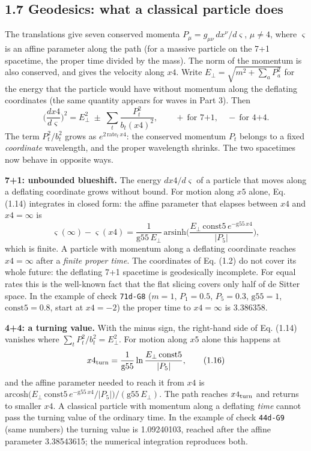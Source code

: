 \documentclass[
  10pt,
]{article}
\begin{document}
\hypertarget{geodesics-what-a-classical-particle-does}{%
\subsection{1.7 Geodesics: what a classical particle
does}\label{geodesics-what-a-classical-particle-does}}

The translations give seven conserved momenta
\(P_\mu=g_{\mu\nu}\,dx^\nu/d\varsigma\), \(\mu\neq4\), where
\(\varsigma\) is an affine parameter along the path (for a massive
particle on the 7+1 spacetime, the proper time divided by the mass). The
norm of the momentum is also conserved, and gives the velocity along
\(x4\). Write \(E_\perp=\sqrt{m^2+\sum_aP_a^2}\) for the energy that the
particle would have without momentum along the deflating coordinates
(the same quantity appears for waves in Part 3). Then
\[\Big(\frac{dx4}{d\varsigma}\Big)^2=E_\perp^2\;\pm\;\sum_t\frac{P_t^2}{b_t(x4)^2},\qquad
+\ \text{for 7+1},\quad -\ \text{for 4+4}.\tag{1.14}\] The term
\(P_t^2/b_t^2\) grows as \(e^{2\,\mathrm{rate}_t\,x4}\): the conserved
momentum \(P_t\) belongs to a fixed \emph{coordinate} wavelength, and
the proper wavelength shrinks. The two spacetimes now behave in opposite
ways.

\textbf{7+1: unbounded blueshift.} The energy \(dx4/d\varsigma\) of a
particle that moves along a deflating coordinate grows without bound.
For motion along \(x5\) alone, Eq. (1.14) integrates in closed form: the
affine parameter that elapses between \(x4\) and \(x4=\infty\) is
\[\varsigma(\infty)-\varsigma(x4)=\frac{1}{\mathrm{g55}\,E_\perp}\,
\mathrm{arsinh}\Big(\frac{E_\perp\,\mathrm{const5}\,e^{-\mathrm{g55}\,x4}}{\lvert P_5\rvert}\Big),\tag{1.15}\]
which is finite. A particle with momentum along a deflating coordinate
reaches \(x4=\infty\) after a \emph{finite proper time}. The coordinates
of Eq. (1.2) do not cover its whole future: the deflating 7+1 spacetime
is geodesically incomplete. For equal rates this is the well-known fact
that the flat slicing covers only half of de Sitter space. In the
example of check \texttt{71d-G8} (\(m=1\), \(P_1=0.5\), \(P_5=0.3\),
\(\mathrm{g55}=1\), \(\mathrm{const5}=0.8\), start at \(x4=-2\)) the
proper time to \(x4=\infty\) is 3.386358.

\textbf{4+4: a turning value.} With the minus sign, the right-hand side
of Eq. (1.14) vanishes where \(\sum_tP_t^2/b_t^2=E_\perp^2\). For motion
along \(x5\) alone this happens at
\[x4_{\rm turn}=\frac{1}{\mathrm{g55}}\ln\frac{E_\perp\,\mathrm{const5}}{\lvert P_5\rvert},\tag{1.16}\]
and the affine parameter needed to reach it from \(x4\) is
\(\mathrm{arcosh}\big(E_\perp\,\mathrm{const5}\,e^{-\mathrm{g55}\,x4}/\lvert P_5\rvert\big)/(\mathrm{g55}\,E_\perp)\).
The path reaches \(x4_{\rm turn}\) and returns to smaller \(x4\). A
classical particle with momentum along a deflating \emph{time} cannot
pass the turning value of the ordinary time. In the example of check
\texttt{44d-G9} (same numbers) the turning value is 1.09240103, reached
after the affine parameter 3.38543615; the numerical integration
reproduces both.
\end{document}
